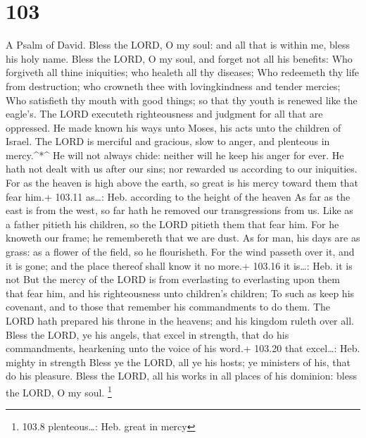 \hypertarget{section-102}{%
\section{103}\label{section-102}}

A Psalm of David.  Bless the LORD, O my soul: and all that
is within me, bless his holy name.  Bless the LORD, O my
soul, and forget not all his benefits:  Who forgiveth all
thine iniquities; who healeth all thy diseases;  Who
redeemeth thy life from destruction; who crowneth thee with
lovingkindness and tender mercies;  Who satisfieth thy mouth
with good things; so that thy youth is renewed like the eagle's.
 The LORD executeth righteousness and judgment for all that
are oppressed.  He made known his ways unto Moses, his acts
unto the children of Israel.  The LORD is merciful and
gracious, slow to anger, and plenteous in mercy.\^{}*\^{} 
He will not always chide: neither will he keep his anger for ever.
 He hath not dealt with us after our sins; nor rewarded us
according to our iniquities.  For as the heaven is high
above the earth, so great is his mercy toward them that fear him.+
103.11 as\ldots: Heb. according to the height of the heaven
 As far as the east is from the west, so far hath he
removed our transgressions from us.  Like as a father
pitieth his children, so the LORD pitieth them that fear him.
 For he knoweth our frame; he remembereth that we are dust.
 As for man, his days are as grass: as a flower of the
field, so he flourisheth.  For the wind passeth over it,
and it is gone; and the place thereof shall know it no more.+ 103.16 it
is\ldots: Heb. it is not  But the mercy of the LORD is from
everlasting to everlasting upon them that fear him, and his
righteousness unto children's children;  To such as keep
his covenant, and to those that remember his commandments to do them.
 The LORD hath prepared his throne in the heavens; and his
kingdom ruleth over all.  Bless the LORD, ye his angels,
that excel in strength, that do his commandments, hearkening unto the
voice of his word.+ 103.20 that excel\ldots: Heb. mighty in strength
 Bless ye the LORD, all ye his hosts; ye ministers of his,
that do his pleasure.  Bless the LORD, all his works in all
places of his dominion: bless the LORD, O my soul. \footnote{103.8
  plenteous\ldots: Heb. great in mercy}

